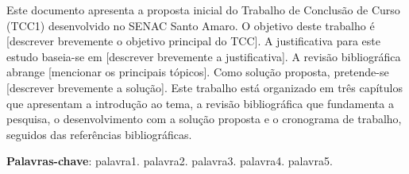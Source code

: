 \documentclass[
    12pt,                %
    openright,           %
    oneside,             %
    a4paper,             %
    english,             %
    brazil               %
]{abntex2}
\begin{document}

\frenchspacing

\pretextual

\imprimircapa

\imprimirfolhaderosto

\begin{resumo}
Este documento apresenta a proposta inicial do Trabalho de Conclusão de Curso (TCC1)
desenvolvido no SENAC Santo Amaro. O objetivo deste trabalho é [descrever brevemente
o objetivo principal do TCC]. A justificativa para este estudo baseia-se em [descrever
brevemente a justificativa]. A revisão bibliográfica abrange [mencionar os principais tópicos].
Como solução proposta, pretende-se [descrever brevemente a solução]. Este trabalho está
organizado em três capítulos que apresentam a introdução ao tema, a revisão bibliográfica
que fundamenta a pesquisa, o desenvolvimento com a solução proposta e o cronograma de
trabalho, seguidos das referências bibliográficas.

\vspace{\onelineskip}

\noindent
\textbf{Palavras-chave}: palavra1. palavra2. palavra3. palavra4. palavra5.
\end{resumo}



\tableofcontents*
\cleardoublepage
\end{document}
